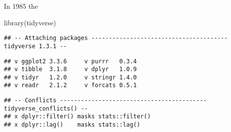 \documentclass[
]{article}
\newenvironment{Shaded}{\begin{snugshade}}{\end{snugshade}}
\newcommand{\FunctionTok}[1]{\textcolor[rgb]{0.00,0.00,0.00}{#1}}
\newcommand{\NormalTok}[1]{#1}
\theoremstyle{definition}
\theoremstyle{definition}
\theoremstyle{definition}
\theoremstyle{definition}
\theoremstyle{remark}
\begin{document}
In 1985 the

\begin{Shaded}
\begin{Highlighting}[]
\FunctionTok{library}\NormalTok{(tidyverse)}
\end{Highlighting}
\end{Shaded}

\begin{verbatim}
## -- Attaching packages --------------------------------------- tidyverse 1.3.1 --
\end{verbatim}

\begin{verbatim}
## v ggplot2 3.3.6     v purrr   0.3.4
## v tibble  3.1.8     v dplyr   1.0.9
## v tidyr   1.2.0     v stringr 1.4.0
## v readr   2.1.2     v forcats 0.5.1
\end{verbatim}

\begin{verbatim}
## -- Conflicts ------------------------------------------ tidyverse_conflicts() --
## x dplyr::filter() masks stats::filter()
## x dplyr::lag()    masks stats::lag()
\end{verbatim}
\end{document}
